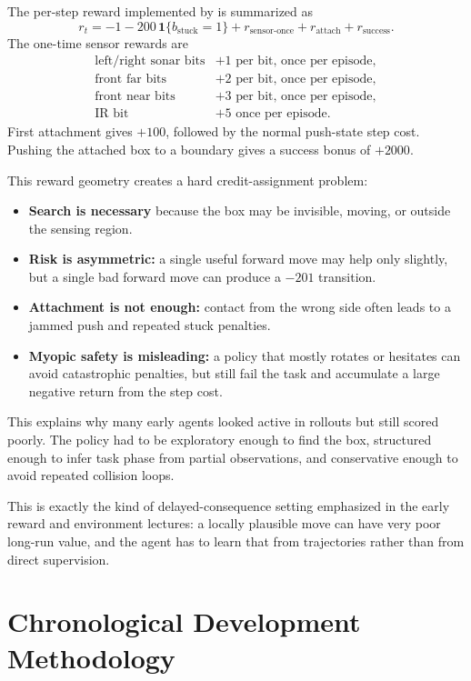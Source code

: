 \documentclass[11pt, oneside]{article}   	%
\begin{document}
The per-step reward implemented by  is summarized as
\[
  r_t =
  -1
  - 200\,\mathbf{1}\{b_{\text{stuck}}=1\}
  + r_{\text{sensor-once}}
  + r_{\text{attach}}
  + r_{\text{success}}.
\]
The one-time sensor rewards are
\[
\begin{array}{ll}
\text{left/right sonar bits} & +1 \text{ per bit, once per episode},\\
\text{front far bits}       & +2 \text{ per bit, once per episode},\\
\text{front near bits}      & +3 \text{ per bit, once per episode},\\
\text{IR bit}               & +5 \text{ once per episode}.
\end{array}
\]
First attachment gives \(+100\), followed by the normal push-state step cost. Pushing
the attached box to a boundary gives a success bonus of \(+2000\).

This reward geometry creates a hard credit-assignment problem:
\begin{itemize}[leftmargin=1.5em]
  \item \textbf{Search is necessary} because the box may be invisible, moving, or outside
  the sensing region.
  \item \textbf{Risk is asymmetric:} a single useful forward move may help only slightly,
  but a single bad forward move can produce a \(-201\) transition.
  \item \textbf{Attachment is not enough:} contact from the wrong side often leads to a
  jammed push and repeated stuck penalties.
  \item \textbf{Myopic safety is misleading:} a policy that mostly rotates or hesitates can
  avoid catastrophic penalties, but still fail the task and accumulate a large negative
  return from the step cost.
\end{itemize}

This explains why many early agents looked active in rollouts but still scored poorly.
The policy had to be exploratory enough to find the box, structured enough to infer task
phase from partial observations, and conservative enough to avoid repeated collision
loops.

This is exactly the kind of delayed-consequence setting emphasized in the early reward
and environment lectures: a locally plausible move can have very poor long-run value, and
the agent has to learn that from trajectories rather than from direct supervision.

\section{Chronological Development Methodology}
\end{document}
